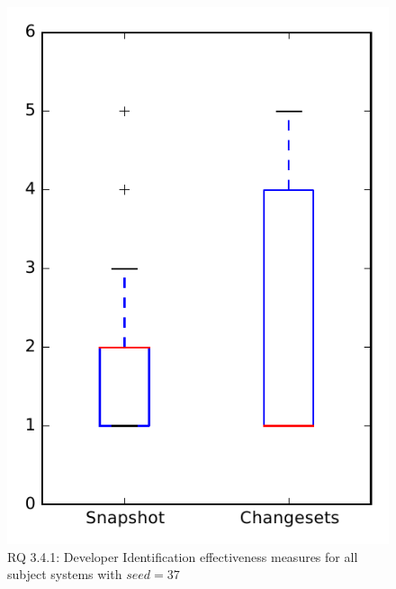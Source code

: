 
\begin{figure}
\centering
\includegraphics[height=0.4\textheight]{figures/dit_seed/rq1_overview_37}
\caption{RQ 3.4.1: Developer Identification effectiveness measures for all subject systems with $seed=37$}
\label{fig:dit_seed:rq1:overview}
\end{figure}
